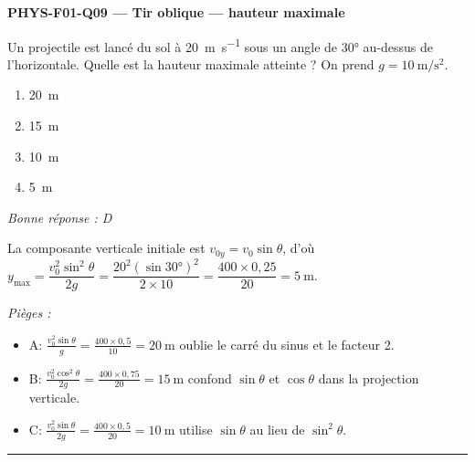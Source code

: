 \documentclass[11pt,a4paper]{article}
\newcommand{\vv}[1]{\vec{#1}}\newcommand{\ds}{\displaystyle}
\begin{document}
\noindent\textbf{PHYS-F01-Q09 --- Tir oblique --- hauteur maximale}\par
Un projectile est lancé du sol à \qty{20}{\metre\per\second} sous un angle de \ang{30} au-dessus de l'horizontale. Quelle est la hauteur maximale atteinte ? On prend $g=\qty{10}{\metre\per\second\squared}$.
\begin{center}
\end{center}
\begin{enumerate}[label=\Alph*)]
\item \qty{20}{\metre}
\item \qty{15}{\metre}
\item \qty{10}{\metre}
\item \qty{5}{\metre}
\end{enumerate}
\textit{Bonne réponse : D}\par
La composante verticale initiale est $v_{0y}=v_0\sin\theta$, d'où $y_{\max}=\dfrac{v_0^2\sin^2\theta}{2g}=\dfrac{20^2(\sin\ang{30})^2}{2\times 10}=\dfrac{400\times 0{,}25}{20}=\qty{5}{\metre}$.\par
\textit{Pièges :}
\begin{itemize}
\item A: $\frac{v_0^2\sin\theta}{g}=\frac{400\times 0{,}5}{10}=\qty{20}{\metre}$ oublie le carré du sinus et le facteur 2.
\item B: $\frac{v_0^2\cos^2\theta}{2g}=\frac{400\times 0{,}75}{20}=\qty{15}{\metre}$ confond $\sin\theta$ et $\cos\theta$ dans la projection verticale.
\item C: $\frac{v_0^2\sin\theta}{2g}=\frac{400\times 0{,}5}{20}=\qty{10}{\metre}$ utilise $\sin\theta$ au lieu de $\sin^2\theta$.
\end{itemize}
\vspace{8pt}\hrule\vspace{8pt}
\end{document}
